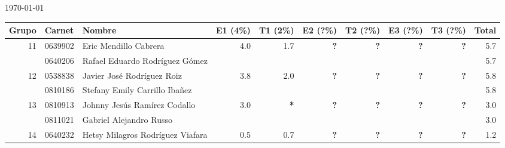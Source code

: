 \documentclass[]{article}
\begin{document}
        \newcommand{\NoE}{\textbf{*}}
        \newcommand{\NoN}{\textbf{—}}
        \newcommand{\NoX}{\textbf{?}}

        \begin{center}
          \today
        \end{center}

        \begin{table}[h!]
        \begin{center}
        \begin{tabular}{ | r | l | l | r | r | r | r | r | r | r | }
                \hline
                Grupo & Carnet & Nombre & E1 (4\%) & T1 (2\%) & E2 (?\%) & T2 (?\%) & E3 (?\%) & T3 (?\%) & Total \\

                \hline
                \multirow{2}{*}{11}
                & 0639902 & Eric Mendillo Cabrera            & \multirow{2}{*}{4.0 } & \multirow{2}{*}{1.7 } & \multirow{2}{*}{\NoX} & \multirow{2}{*}{\NoX} & \multirow{2}{*}{\NoX} & \multirow{2}{*}{\NoX} & 5.7  \\
                & 0640206 & Rafael Eduardo Rodríguez Gómez   &                       &                       &                       &                       &                       &                       & 5.7  \\
                \hline
                \multirow{2}{*}{12}
                & 0538838 & Javier José Rodríguez Roiz       & \multirow{2}{*}{3.8 } & \multirow{2}{*}{2.0 } & \multirow{2}{*}{\NoX} & \multirow{2}{*}{\NoX} & \multirow{2}{*}{\NoX} & \multirow{2}{*}{\NoX} & 5.8  \\
                & 0810186 & Stefany Emily Carrillo Ibañez    &                       &                       &                       &                       &                       &                       & 5.8  \\
                \hline
                \multirow{2}{*}{13}
                & 0810913 & Johnny Jesús Ramírez Codallo     & \multirow{2}{*}{3.0 } & \multirow{2}{*}{\NoE} & \multirow{2}{*}{\NoX} & \multirow{2}{*}{\NoX} & \multirow{2}{*}{\NoX} & \multirow{2}{*}{\NoX} & 3.0  \\
                & 0811021 & Gabriel Alejandro Russo          &                       &                       &                       &                       &                       &                       & 3.0  \\
                \hline
                \multirow{2}{*}{14}
                & 0640232 & Hetsy Milagros Rodríguez Viafara & \multirow{2}{*}{0.5 } & \multirow{2}{*}{0.7 } & \multirow{2}{*}{\NoX} & \multirow{2}{*}{\NoX} & \multirow{2}{*}{\NoX} & \multirow{2}{*}{\NoX} & 1.2  \\

\end{tabular}
\end{center}
\end{table}
\end{document}
